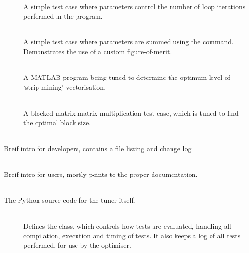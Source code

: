 \documentclass[a4paper, draft]{article}
\begin{document}
\begin{description}
\begin{description}
            \item[] \hfill\\
                A simple test case where parameters control the number of loop 
                iterations performed in the program.
                
            \item[] \hfill\\
                A simple test case where parameters are summed using the 
                 command. Demonstrates the use of a custom 
                figure-of-merit.
                
            \item[] \hfill\\
                A MATLAB program being tuned to determine the optimum 
                level of `strip-mining' vectorisation.
                
            \item[] \hfill\\
                A blocked matrix-matrix multiplication test case, which 
                is tuned to find the optimal block size.
                
        \end{description}
        
        
    \item[\filename{README\_Dev}] \hfill\\
        Breif intro for developers, contains a file listing and change log.
        
    \item[\filename{README\_User}] \hfill\\
        Breif intro for users, mostly points to the proper documentation.
        
    \item[\filename{tuner/}] \hfill\\
        The Python source code for the tuner itself.
        
        \begin{description}
            \item[] \hfill\\
                Defines the  class, which controls how tests 
                are evaluated, handling all compilation, execution and timing 
                of tests. It also keeps a log of all tests performed, 
                for use by the optimiser.


\end{description}
\end{description}
\end{document}
